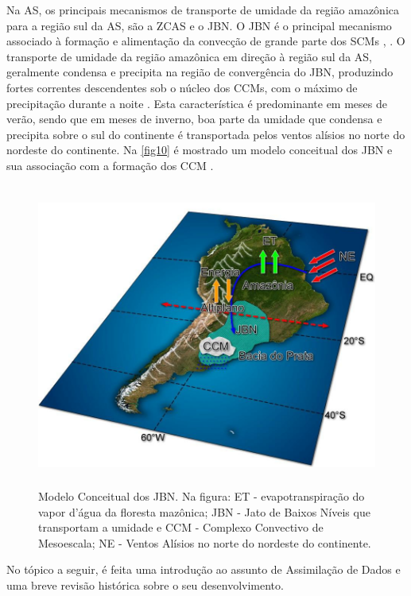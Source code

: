 Na AS, os principais mecanismos de transporte de umidade da região amazônica para a região sul da AS, são a ZCAS e o JBN. O JBN é o principal mecanismo associado à formação e alimentação da convecção de grande parte dos SCMs \cite{ferreiraetal03}, \cite{herdiesetal02}. O transporte de umidade da região amazônica em direção à região sul da AS, geralmente condensa e precipita na região de convergência do JBN, produzindo fortes correntes descendentes sob o núcleo dos CCMs, com o máximo de precipitação durante a noite \cite{noguespaegleberbery00}. Esta característica é predominante em meses de verão, sendo que em meses de inverno, boa parte da umidade que condensa e precipita sobre o sul do continente é transportada pelos ventos alísios no norte do nordeste do continente. Na \autoref{fig10} é mostrado um modelo conceitual dos JBN e sua associação com a formação dos CCM \cite{marengoetal04}.

\begin{figure}

\includegraphics[height=10cm]{./figs/fig10.png}
\caption{Modelo Conceitual dos JBN. Na figura: ET - evapotranspiração do vapor d'água da floresta mazônica; JBN - Jato de Baixos Níveis que transportam a umidade e CCM - Complexo Convectivo de Mesoescala; NE - Ventos Alísios no norte do nordeste do continente.}
\label{fig10}
\end{figure}

No tópico a seguir, é feita uma introdução ao assunto de Assimilação de Dados e uma breve revisão histórica sobre o seu desenvolvimento.

